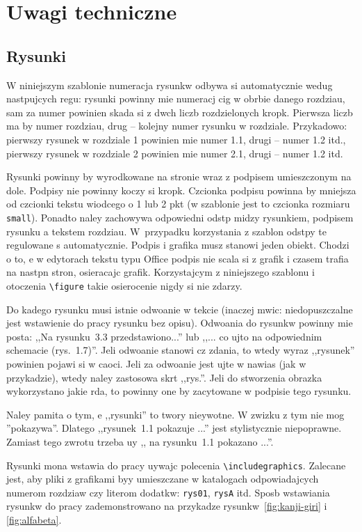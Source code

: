 \chapter{Uwagi techniczne}
\section{Rysunki}
W niniejszym szablonie numeracja rysunkw odbywa si automatycznie wedug nastpujcych regu: rysunki powinny mie numeracj cig w obrbie danego rozdziau, sam za numer powinien skada si z dwch liczb rozdzielonych kropk. Pierwsza liczb ma by numer rozdziau, drug -- kolejny numer rysunku w rozdziale. Przykadowo: pierwszy rysunek w rozdziale 1 powinien mie numer 1.1, drugi -- numer 1.2 itd., pierwszy rysunek w rozdziale 2 powinien mie numer 2.1, drugi -- numer 1.2 itd. 

Rysunki powinny by wyrodkowane na stronie wraz z podpisem umieszczonym na dole. Podpisy nie powinny koczy si kropk. Czcionka podpisu powinna by mniejsza od czcionki tekstu wiodcego o 1 lub 2 pkt (w szablonie jest to czcionka rozmiaru \texttt{small}). Ponadto naley zachowywa odpowiedni odstp midzy rysunkiem, podpisem rysunku a tekstem rozdziau. 
W~przypadku korzystania z szablon odstpy te regulowane s automatycznie. Podpis i grafika musz stanowi jeden obiekt. Chodzi o to, e w edytorach tekstu typu Office podpis nie scala si z grafik i czasem trafia na nastpn stron, osieracajc grafik. Korzystajcym z niniejszego szablonu i otoczenia \verb?\figure? takie osierocenie nigdy si nie zdarzy.  

Do kadego rysunku musi istnie odwoanie w tekcie (inaczej mwic: niedopuszczalne jest wstawienie do pracy rysunku bez opisu). Odwoania do rysunkw powinny mie posta: ,,Na rysunku~3.3 przedstawiono...'' lub ,,... co ujto na odpowiednim schemacie (rys.~1.7)''. 
Jeli odwoanie stanowi cz zdania, to wtedy wyraz ,,rysunek'' powinien pojawi si w caoci. Jeli za odwoanie jest ujte w nawias (jak w przykadzie), wtedy naley zastosowa skrt ,,rys.''. Jeli do stworzenia obrazka wykorzystano jakie rda, to powinny one by zacytowane w podpisie tego rysunku. 

Naley pamita o tym, e ,,rysunki'' to twory nieywotne. W zwizku z tym nie mog ''pokazywa''. Dlatego ,,rysunek~1.1 pokazuje ...'' jest stylistycznie niepoprawne. Zamiast tego zwrotu trzeba uy ,, na rysunku~1.1 pokazano ...''.

Rysunki mona wstawia do pracy uywajc polecenia \verb|\includegraphics|. Zalecane jest, aby pliki z grafikami byy umieszczane w katalogach 
odpowiadajcych numerom rozdziaw czy literom dodatkw: \verb|rys01|, \verb|rysA| itd. Sposb wstawiania rysunkw do pracy zademonstrowano na przykadze rysunkw~\ref{fig:kanji-giri} i \ref{fig:alfabeta}.

